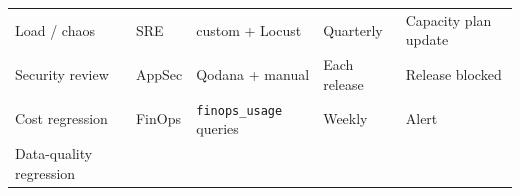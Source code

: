 \documentclass[
  11pt,
  british,
  oneside]{book}
\begin{document}
\begin{longtable}[]{@{}lllll@{}}
\begin{minipage}[t]{0.17\columnwidth}
Load / chaos\strut
\end{minipage} & \begin{minipage}[t]{0.17\columnwidth}\raggedright
SRE\strut
\end{minipage} & \begin{minipage}[t]{0.17\columnwidth}\raggedright
custom + Locust\strut
\end{minipage} & \begin{minipage}[t]{0.17\columnwidth}\raggedright
Quarterly\strut
\end{minipage} & \begin{minipage}[t]{0.17\columnwidth}\raggedright
Capacity plan update\strut
\end{minipage}\tabularnewline
\begin{minipage}[t]{0.17\columnwidth}\raggedright
Security review\strut
\end{minipage} & \begin{minipage}[t]{0.17\columnwidth}\raggedright
AppSec\strut
\end{minipage} & \begin{minipage}[t]{0.17\columnwidth}\raggedright
Qodana + manual\strut
\end{minipage} & \begin{minipage}[t]{0.17\columnwidth}\raggedright
Each release\strut
\end{minipage} & \begin{minipage}[t]{0.17\columnwidth}\raggedright
Release blocked\strut
\end{minipage}\tabularnewline
\begin{minipage}[t]{0.17\columnwidth}\raggedright
Cost regression\strut
\end{minipage} & \begin{minipage}[t]{0.17\columnwidth}\raggedright
FinOps\strut
\end{minipage} & \begin{minipage}[t]{0.17\columnwidth}\raggedright
\texttt{finops\_usage} queries\strut
\end{minipage} & \begin{minipage}[t]{0.17\columnwidth}\raggedright
Weekly\strut
\end{minipage} & \begin{minipage}[t]{0.17\columnwidth}\raggedright
Alert\strut
\end{minipage}\tabularnewline
\begin{minipage}[t]{0.17\columnwidth}\raggedright
Data-quality regression\strut
\end{minipage} & \begin{minipage}[t]{0.17\columnwidth}\raggedright

\end{minipage}
\end{longtable}
\end{document}
